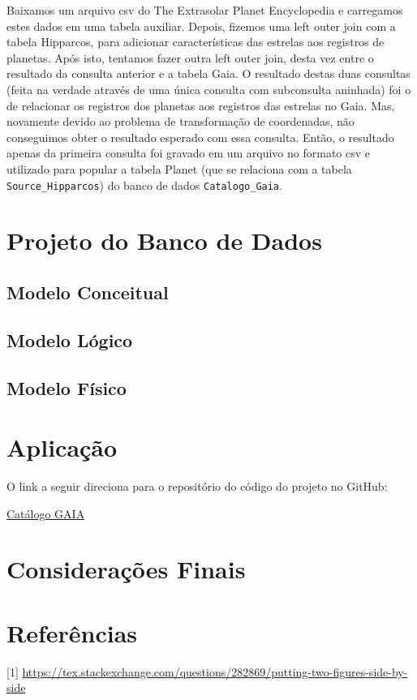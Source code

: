 \documentclass[12pt, a4paper]{article}
\begin{document}
	Baixamos um arquivo csv do The Extrasolar Planet Encyclopedia e carregamos estes dados em uma tabela auxiliar. Depois, fizemos uma left outer join com a tabela Hipparcos, para adicionar características das estrelas aos registros de planetas. Após isto, tentamos fazer outra left outer join, desta vez entre o resultado da consulta anterior e a tabela Gaia. O resultado destas duas consultas (feita na verdade através de uma única consulta com subconsulta aninhada) foi o de relacionar os registros dos planetas aos registros das estrelas no Gaia. Mas, novamente devido ao problema de transformação de coordenadas, não conseguimos obter o resultado esperado com essa consulta. Então, o resultado apenas da primeira consulta foi gravado em um arquivo no formato csv e utilizado para popular a tabela Planet (que se relaciona com a tabela \verb|Source_Hipparcos|) do banco de dados \verb|Catalogo_Gaia|.
	
	\section{Projeto do Banco de Dados}
	
	\subsection{Modelo Conceitual}
	\subsection{Modelo Lógico}
	\subsection{Modelo Físico}
	
	\section{Aplicação}
	
	O link a seguir direciona para o repositório do código do projeto no GitHub:
	
	\href{https://github.com/Laura-Costa/Catalogo_GAIA}{Catálogo GAIA} 
	\section{Considerações Finais}
	
	\newpage
	\section*{Referências}
	
	\vspace{20pt}
	
	[1] \url{https://tex.stackexchange.com/questions/282869/putting-two-figures-side-by-side}
	

	
	
	
\end{document}
